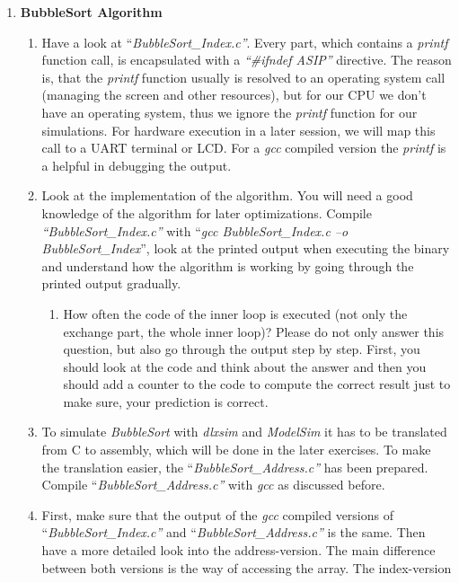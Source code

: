 \begin{enumerate}
\item \textbf{BubbleSort Algorithm}
	\begin{enumerate}
		\item
		Have a look at ``\emph{BubbleSort\_Index.c''}. Every part, which
		contains a \emph{printf} function call, is encapsulated with a
		\emph{``\#ifndef ASIP''} directive. The reason is, that the
		\emph{printf} function usually is resolved to an operating system
		call (managing the screen and other resources), but for our CPU we
		don't have an operating system, thus we ignore the \emph{printf}
		function for our simulations. For hardware execution in a later
		session, we will map this call to a UART terminal or LCD. For a
		\emph{gcc} compiled version the \emph{printf} is a helpful in
		debugging the output.
		\item
		Look at the implementation of the algorithm. You will need a good
		knowledge of the algorithm for later optimizations. Compile
		\emph{``BubbleSort\_Index.c''} with ``\emph{gcc BubbleSort\_Index.c
			--o BubbleSort\_Index}'', look at the printed output when executing
		the binary and understand how the algorithm is working by going
		through the printed output gradually.
		\begin{enumerate}[label=(\alph*)]
			\color{red}\item\normalcolor
			How often the code of the inner loop is executed (not only the
			exchange part, the whole inner loop)? Please do not only answer this
			question, but also go through the output step by step. First, you
			should look at the code and think about the answer and then you should
			add a counter to the code to compute the correct result just to make
			sure, your prediction is correct.
		\end{enumerate}
		\item
		To simulate \emph{BubbleSort} with \emph{dlxsim} and \emph{ModelSim}
		it has to be translated from C to assembly, which will be done in
		the later exercises. To make the translation easier, the
		``\emph{BubbleSort\_Address.c''} has been prepared. Compile
		``\emph{BubbleSort\_Address.c''} with \emph{gcc} as discussed
		before.
		\item
		First, make sure that the output of the \emph{gcc} compiled versions
		of ``\emph{BubbleSort\_Index.c''} and
		``\emph{BubbleSort\_Address.c''} is the same. Then have a more
		detailed look into the address-version. The main difference between
		both versions is the way of accessing the array. The index-version

\end{enumerate}
\end{enumerate}
